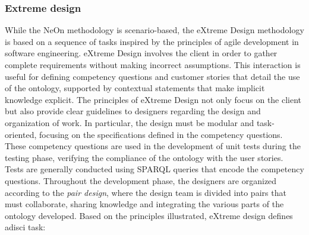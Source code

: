 \subsubsection{Extreme design}
While the NeOn methodology is scenario-based, the eXtreme Design methodology \cite{presutti2009extreme} is based on a sequence of tasks inspired by the principles of agile development in software engineering. eXtreme Design involves the client in order to gather complete requirements without making incorrect assumptions. This interaction is useful for defining competency questions and customer stories that detail the use of the ontology, supported by contextual statements that make implicit knowledge explicit. The principles of eXtreme Design not only focus on the client but also provide clear guidelines to designers regarding the design and organization of work. In particular, the design must be modular and task-oriented, focusing on the specifications defined in the competency questions. These competency questions are used in the development of unit tests during the testing phase, verifying the compliance of the ontology with the user stories. Tests are generally conducted using SPARQL queries that encode the competency questions. Throughout the development phase, the designers are organized according to the \textit{pair design}, where the design team is divided into pairs that must collaborate, sharing knowledge and integrating the various parts of the ontology developed. Based on the principles illustrated, eXtreme design defines adisci task: 
